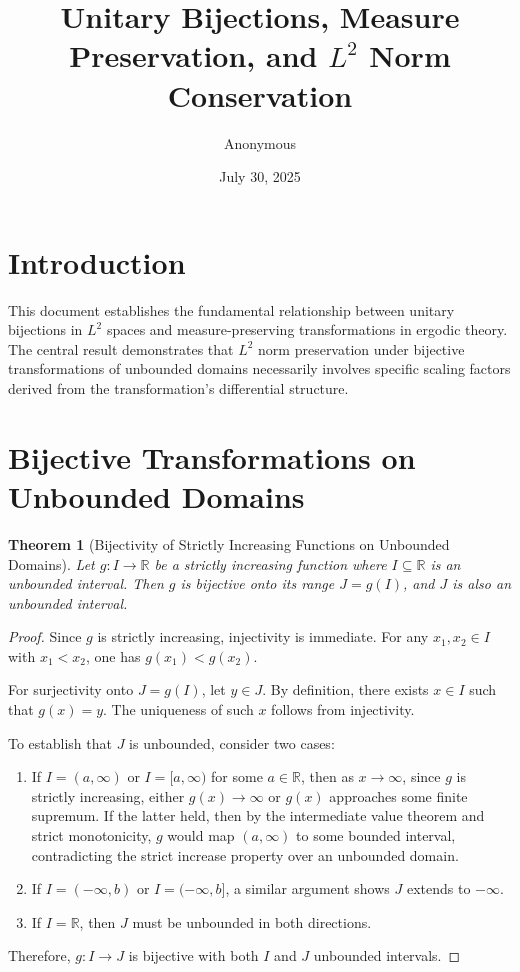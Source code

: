 \documentclass[11pt]{article}
\title{Unitary Bijections, Measure Preservation, and $L^2$ Norm Conservation}
\author{Anonymous}
\date{July 30, 2025}
\theoremstyle{theorem}
\newtheorem{theorem}{Theorem}[section]
\theoremstyle{definition}
\begin{document}
\maketitle

\section{Introduction}

This document establishes the fundamental relationship between unitary bijections in $L^2$ spaces and measure-preserving transformations in ergodic theory. The central result demonstrates that $L^2$ norm preservation under bijective transformations of unbounded domains necessarily involves specific scaling factors derived from the transformation's differential structure.

\section{Bijective Transformations on Unbounded Domains}

\begin{theorem}[Bijectivity of Strictly Increasing Functions on Unbounded Domains]
\label{thm:bijective_unbounded}
Let $g: I \to \mathbb{R}$ be a strictly increasing function where $I \subseteq \mathbb{R}$ is an unbounded interval. Then $g$ is bijective onto its range $J = g(I)$, and $J$ is also an unbounded interval.
\end{theorem}

\begin{proof}
Since $g$ is strictly increasing, injectivity is immediate. For any $x_1, x_2 \in I$ with $x_1 < x_2$, one has $g(x_1) < g(x_2)$.

For surjectivity onto $J = g(I)$, let $y \in J$. By definition, there exists $x \in I$ such that $g(x) = y$. The uniqueness of such $x$ follows from injectivity.

To establish that $J$ is unbounded, consider two cases:
\begin{enumerate}
\item If $I = (a, \infty)$ or $I = [a, \infty)$ for some $a \in \mathbb{R}$, then as $x \to \infty$, since $g$ is strictly increasing, either $g(x) \to \infty$ or $g(x)$ approaches some finite supremum. If the latter held, then by the intermediate value theorem and strict monotonicity, $g$ would map $(a, \infty)$ to some bounded interval, contradicting the strict increase property over an unbounded domain.

\item If $I = (-\infty, b)$ or $I = (-\infty, b]$, a similar argument shows $J$ extends to $-\infty$.

\item If $I = \mathbb{R}$, then $J$ must be unbounded in both directions.
\end{enumerate}

Therefore, $g: I \to J$ is bijective with both $I$ and $J$ unbounded intervals.
\end{proof}
\end{document}
